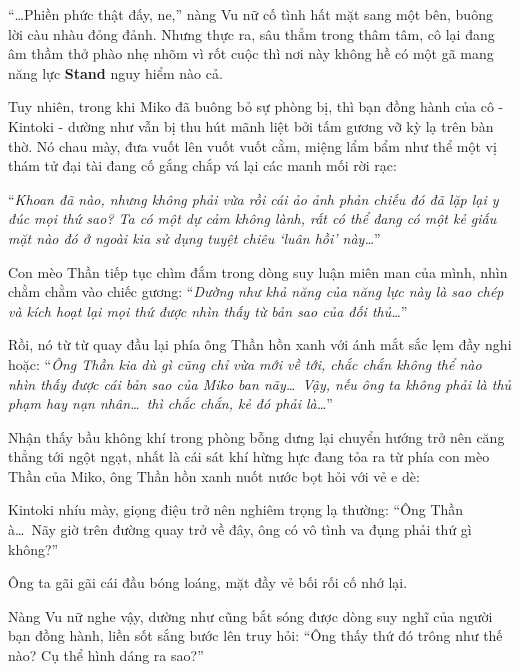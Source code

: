 \documentclass[../main.tex]{subfiles}
\begin{document}

``\dots Phiền phức thật đấy, ne,'' nàng Vu nữ cố tình hất mặt sang một bên, buông lời càu nhàu đỏng đảnh. Nhưng thực ra, sâu thẳm trong thâm tâm, cô lại đang âm thầm thở phào nhẹ nhõm vì rốt cuộc thì nơi này không hề có một gã mang năng lực \textbf{Stand} nguy hiểm nào cả.

Tuy nhiên, trong khi Miko đã buông bỏ sự phòng bị, thì bạn đồng hành của cô - Kintoki - dường như vẫn bị thu hút mãnh liệt bởi tấm gương vỡ kỳ lạ trên bàn thờ. Nó chau mày, đưa vuốt lên vuốt vuốt cằm, miệng lẩm bẩm như thể một vị thám tử đại tài đang cố gắng chắp vá lại các manh mối rời rạc:


``\textit{Khoan đã nào, nhưng không phải vừa rồi cái ảo ảnh phản chiếu đó đã lặp lại y đúc mọi thứ sao? Ta có một dự cảm không lành, rất có thể đang có một kẻ giấu mặt nào đó ở ngoài kia sử dụng tuyệt chiêu `luân hồi' này\dots}''

Con mèo Thần tiếp tục chìm đắm trong dòng suy luận miên man của mình, nhìn chằm chằm vào chiếc gương: ``\textit{Dường như khả năng của năng lực này là sao chép và kích hoạt lại mọi thứ được nhìn thấy từ bản sao của đối thủ\dots}''

Rồi, nó từ từ quay đầu lại phía ông Thần hồn xanh với ánh mắt sắc lẹm đầy nghi hoặc: ``\textit{Ông Thần kia dù gì cũng chỉ vừa mới về tới, chắc chắn không thể nào nhìn thấy được cái bản sao của Miko ban nãy\dots\ Vậy, nếu ông ta không phải là thủ phạm hay nạn nhân\dots\ thì chắc chắn, kẻ đó phải là\dots}''

Nhận thấy bầu không khí trong phòng bỗng dưng lại chuyển hướng trở nên căng thẳng tới ngột ngạt, nhất là cái sát khí hừng hực đang tỏa ra từ phía con mèo Thần của Miko, ông Thần hồn xanh nuốt nước bọt hỏi với vẻ e dè:


Kintoki nhíu mày, giọng điệu trở nên nghiêm trọng lạ thường: ``Ông Thần à\dots\ Nãy giờ trên đường quay trở về đây, ông có vô tình va đụng phải thứ gì không?''


Ông ta gãi gãi cái đầu bóng loáng, mặt đầy vẻ bối rối cố nhớ lại.

Nàng Vu nữ nghe vậy, dường như cũng bắt sóng được dòng suy nghĩ của người bạn đồng hành, liền sốt sắng bước lên truy hỏi: ``Ông thấy thứ đó trông như thế nào? Cụ thể hình dáng ra sao?''
\end{document}
